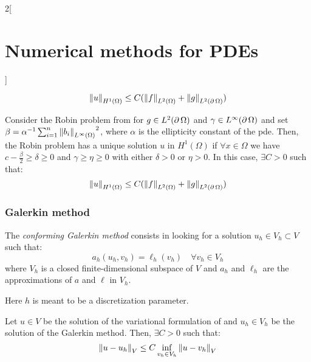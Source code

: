 \documentclass[../../../main_math.tex]{subfiles}
\begin{document}
\begin{multicols}{2}[\section{Numerical methods for PDEs}]
\begin{proposition}
    $$
      \left\|u\right\|_{H^1(\Omega)}\leq C(\left\|f\right\|_{L^2(\Omega)}+\left\|g\right\|_{L^2(\operatorname{\partial}\Omega)})
    $$
  \end{proposition}
  \begin{proposition}
    Consider the Robin problem from  for $g\in L^2(\operatorname{\partial}\Omega)$ and $\gamma\in L^\infty(\operatorname{\partial}\Omega)$ and set $\beta=\alpha^{-1}\sum_{i=1}^n{\left\|b_i\right\|_{L^\infty(\Omega)}}^2$, where $\alpha$ is the ellipticity constant of the pde. Then, the Robin problem has a unique solution $u$ in $H^1(\Omega)$ if $\forall x\in\Omega$ we have $c-\frac{\beta}{2}\geq\delta\geq 0$ and $\gamma\geq \eta\geq 0$ with either $\delta>0$ or $\eta>0$. In this case, $\exists C>0$ such that:
    $$
      \left\|u\right\|_{H^1(\Omega)}\leq C(\left\|f\right\|_{L^2(\Omega)}+\left\|g\right\|_{L^2(\operatorname{\partial}\Omega)})
    $$
  \end{proposition}
  \subsubsection{Galerkin method}
  \begin{definition}
    The \emph{conforming Galerkin method} consists in looking for a solution $u_h\in V_h\subset V$ such that:
    $$
      a_h(u_h,v_h)=\ell_h(v_h)\quad\forall v_h\in V_h
    $$
    where $V_h$ is a closed finite-dimensional subspace of $V$ and $a_h$ and $\ell_h$ are the approximations of $a$ and $\ell$ in $V_h$.
  \end{definition}
  \begin{remark}
    Here $h$ is meant to be a discretization parameter.
  \end{remark}
  \begin{theorem}
    Let $u\in V$ be the solution of the variational formulation of  and $u_h\in V_h$ be the solution of the Galerkin method. Then, $\exists C>0$ such that:
    $$
      \left\|u-u_h\right\|_V\leq C\inf_{v_h\in V_h}\left\|u-v_h\right\|_V
    $$

  \end{theorem}

\end{multicols}
\end{document}
